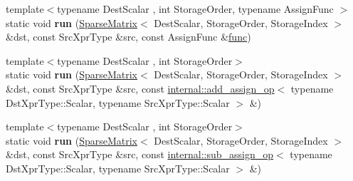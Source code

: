 \begin{DoxyCompactItemize}
\mbox{\label{struct_eigen_1_1internal_1_1_assignment_3_01_dst_xpr_type_00_01_src_xpr_type_00_01_functor_00_017b35cf78061a31c93b838bddfa619fa3_a77cd302a30c64789f91ba23771433091}} 
{\footnotesize template$<$typename Dest\+Scalar , int Storage\+Order, typename Assign\+Func $>$ }\\static void {\bfseries run} (\hyperlink{group___sparse_core___module_class_eigen_1_1_sparse_matrix}{Sparse\+Matrix}$<$ Dest\+Scalar, Storage\+Order, Storage\+Index $>$ \&dst, const Src\+Xpr\+Type \&src, const Assign\+Func \&\hyperlink{structfunc}{func})
\item 
\mbox{\label{struct_eigen_1_1internal_1_1_assignment_3_01_dst_xpr_type_00_01_src_xpr_type_00_01_functor_00_017b35cf78061a31c93b838bddfa619fa3_a2f4176d30e11f2c578e3e81b399518cb}} 
{\footnotesize template$<$typename Dest\+Scalar , int Storage\+Order$>$ }\\static void {\bfseries run} (\hyperlink{group___sparse_core___module_class_eigen_1_1_sparse_matrix}{Sparse\+Matrix}$<$ Dest\+Scalar, Storage\+Order, Storage\+Index $>$ \&dst, const Src\+Xpr\+Type \&src, const \hyperlink{struct_eigen_1_1internal_1_1add__assign__op}{internal\+::add\+\_\+assign\+\_\+op}$<$ typename Dst\+Xpr\+Type\+::\+Scalar, typename Src\+Xpr\+Type\+::\+Scalar $>$ \&)
\item 
\mbox{\label{struct_eigen_1_1internal_1_1_assignment_3_01_dst_xpr_type_00_01_src_xpr_type_00_01_functor_00_017b35cf78061a31c93b838bddfa619fa3_ae387083532d1a0e38c4b8f2427610c9b}} 
{\footnotesize template$<$typename Dest\+Scalar , int Storage\+Order$>$ }\\static void {\bfseries run} (\hyperlink{group___sparse_core___module_class_eigen_1_1_sparse_matrix}{Sparse\+Matrix}$<$ Dest\+Scalar, Storage\+Order, Storage\+Index $>$ \&dst, const Src\+Xpr\+Type \&src, const \hyperlink{struct_eigen_1_1internal_1_1sub__assign__op}{internal\+::sub\+\_\+assign\+\_\+op}$<$ typename Dst\+Xpr\+Type\+::\+Scalar, typename Src\+Xpr\+Type\+::\+Scalar $>$ \&)
\item 

\end{DoxyCompactItemize}
